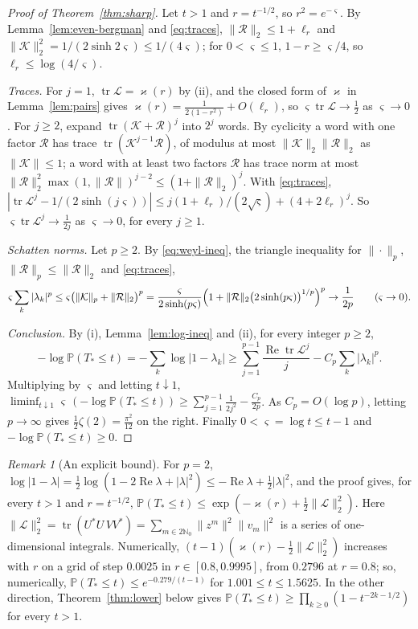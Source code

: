 \documentclass[11pt]{amsart}
\theoremstyle{definition}
\theoremstyle{remark}
\newtheorem{remark}[theorem]{Remark}
\numberwithin{equation}{section}
\newcommand{\N}{\mathbb{N}}
\newcommand{\PP}{\mathbb{P}}
\DeclareMathOperator{\re}{Re}
\begin{document}
\begin{proof}[Proof of Theorem~\ref{thm:sharp}]
Let $t>1$ and $r=t^{-1/2}$, so $r^2=e^{-\varsigma}$. By Lemma~\ref{lem:even-bergman} and \eqref{eq:traces}, $\|\mathcal R\|_2\le1+\ell_r$ and $\|\mathcal K\|_2^2=1/(2\sinh2\varsigma)\le1/(4\varsigma)$; for $0<\varsigma\le1$, $1-r\ge\varsigma/4$, so $\ell_r\le\log(4/\varsigma)$.

\emph{Traces.} For $j=1$, $\operatorname{tr}\mathcal L=\varkappa(r)$ by (ii), and the closed form of $\varkappa$ in Lemma~\ref{lem:pairs} gives $\varkappa(r)=\frac1{2(1-r^2)}+O(\ell_r)$, so $\varsigma\operatorname{tr}\mathcal L\to\frac12$ as $\varsigma\to0$. For $j\ge2$, expand $\operatorname{tr}(\mathcal K+\mathcal R)^j$ into $2^j$ words. By cyclicity a word with one factor $\mathcal R$ has trace $\operatorname{tr}(\mathcal K^{j-1}\mathcal R)$, of modulus at most $\|\mathcal K\|_2\|\mathcal R\|_2$ as $\|\mathcal K\|\le1$; a word with at least two factors $\mathcal R$ has trace norm at most $\|\mathcal R\|_2^2\max(1,\|\mathcal R\|)^{j-2}\le(1+\|\mathcal R\|_2)^j$. With \eqref{eq:traces}, $|\operatorname{tr}\mathcal L^j-1/(2\sinh(j\varsigma))|\le j(1+\ell_r)/(2\sqrt\varsigma)+(4+2\ell_r)^j$. So $\varsigma\operatorname{tr}\mathcal L^j\to\frac1{2j}$ as $\varsigma\to0$, for every $j\ge1$.

\emph{Schatten norms.} Let $p\ge2$. By \eqref{eq:weyl-ineq}, the triangle inequality for $\|\cdot\|_p$, $\|\mathcal R\|_p\le\|\mathcal R\|_2$ and \eqref{eq:traces},
\[
\varsigma\sum_k|\lambda_k|^p\le\varsigma\bigl(\|\mathcal K\|_p+\|\mathcal R\|_2\bigr)^p=\frac{\varsigma}{2\sinh(p\varsigma)}\Bigl(1+\|\mathcal R\|_2\bigl(2\sinh(p\varsigma)\bigr)^{1/p}\Bigr)^p\to\frac1{2p}\qquad(\varsigma\to0).
\]

\emph{Conclusion.} By (i), Lemma~\ref{lem:log-ineq} and (ii), for every integer $p\ge2$,
\[
-\log\PP(T_*\le t)=-\sum_k\log|1-\lambda_k|\ge\sum_{j=1}^{p-1}\frac{\re\operatorname{tr}\mathcal L^j}j-C_p\sum_k|\lambda_k|^p .
\]
Multiplying by $\varsigma$ and letting $t\downarrow1$, $\liminf_{t\downarrow1}\varsigma\,(-\log\PP(T_*\le t))\ge\sum_{j=1}^{p-1}\frac1{2j^2}-\frac{C_p}{2p}$. As $C_p=O(\log p)$, letting $p\to\infty$ gives $\frac12\zeta(2)=\frac{\pi^2}{12}$ on the right. Finally $0<\varsigma=\log t\le t-1$ and $-\log\PP(T_*\le t)\ge0$.
\end{proof}

\begin{remark}[An explicit bound]\label{rem:explicit}
For $p=2$, $\log|1-\lambda|=\frac12\log(1-2\re\lambda+|\lambda|^2)\le-\re\lambda+\frac12|\lambda|^2$, and the proof gives, for every $t>1$ and $r=t^{-1/2}$, $\PP(T_*\le t)\le\exp(-\varkappa(r)+\frac12\|\mathcal L\|_2^2)$. Here $\|\mathcal L\|_2^2=\operatorname{tr}(U^*U\,VV^*)=\sum_{m\in2\N_0}\|z^m\|^2\|v_m\|^2$ is a series of one-dimensional integrals. Numerically, $(t-1)(\varkappa(r)-\frac12\|\mathcal L\|_2^2)$ increases with $r$ on a grid of step $0.0025$ in $r\in[0.8,0.9995]$, from $0.2796$ at $r=0.8$; so, numerically, $\PP(T_*\le t)\le e^{-0.279/(t-1)}$ for $1.001\le t\le1.5625$. In the other direction, Theorem~\ref{thm:lower} below gives $\PP(T_*\le t)\ge\prod_{k\ge0}(1-t^{-2k-1/2})$ for every $t>1$.
\end{remark}
\end{document}
